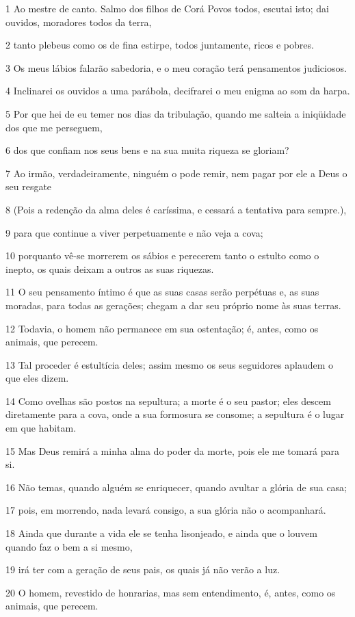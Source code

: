\par 1 Ao mestre de canto. Salmo dos filhos de Corá Povos todos, escutai isto; dai ouvidos, moradores todos da terra,
\par 2 tanto plebeus como os de fina estirpe, todos juntamente, ricos e pobres.
\par 3 Os meus lábios falarão sabedoria, e o meu coração terá pensamentos judiciosos.
\par 4 Inclinarei os ouvidos a uma parábola, decifrarei o meu enigma ao som da harpa.
\par 5 Por que hei de eu temer nos dias da tribulação, quando me salteia a iniqüidade dos que me perseguem,
\par 6 dos que confiam nos seus bens e na sua muita riqueza se gloriam?
\par 7 Ao irmão, verdadeiramente, ninguém o pode remir, nem pagar por ele a Deus o seu resgate
\par 8 (Pois a redenção da alma deles é caríssima, e cessará a tentativa para sempre.),
\par 9 para que continue a viver perpetuamente e não veja a cova;
\par 10 porquanto vê-se morrerem os sábios e perecerem tanto o estulto como o inepto, os quais deixam a outros as suas riquezas.
\par 11 O seu pensamento íntimo é que as suas casas serão perpétuas e, as suas moradas, para todas as gerações; chegam a dar seu próprio nome às suas terras.
\par 12 Todavia, o homem não permanece em sua ostentação; é, antes, como os animais, que perecem.
\par 13 Tal proceder é estultícia deles; assim mesmo os seus seguidores aplaudem o que eles dizem.
\par 14 Como ovelhas são postos na sepultura; a morte é o seu pastor; eles descem diretamente para a cova, onde a sua formosura se consome; a sepultura é o lugar em que habitam.
\par 15 Mas Deus remirá a minha alma do poder da morte, pois ele me tomará para si.
\par 16 Não temas, quando alguém se enriquecer, quando avultar a glória de sua casa;
\par 17 pois, em morrendo, nada levará consigo, a sua glória não o acompanhará.
\par 18 Ainda que durante a vida ele se tenha lisonjeado, e ainda que o louvem quando faz o bem a si mesmo,
\par 19 irá ter com a geração de seus pais, os quais já não verão a luz.
\par 20 O homem, revestido de honrarias, mas sem entendimento, é, antes, como os animais, que perecem.

